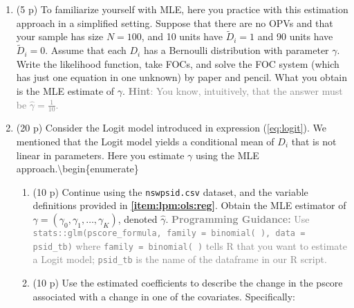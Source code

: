 \documentclass[
]{article}
\begin{document}
\begin{enumerate}
\def\labelenumi{\arabic{enumi}.}
\setcounter{enumi}{3}
\item
  (5 p) To familiarize yourself with MLE, here you practice with this
  estimation approach in a simplified setting. Suppose that there are no
  OPVs and that your sample has size \(N=100\), and 10 units have
  \(\tilde{D}_i=1\) and 90 units have \(\tilde{D}_i=0\). Assume that
  each \(D_i\) has a Bernoulli distribution with parameter \(\gamma\).
  Write the likelihood function, take FOCs, and solve the FOC system
  (which has just one equation in one unknown) by paper and pencil. What
  you obtain is the MLE estimate of \(\gamma\).
  \textcolor{gray}{\textbf{Hint}: You know, intuitively, that the answer must be $\hat{\gamma}=\frac{1}{10}$.}
\item
  (20 p) Consider the Logit model introduced in expression
  (\ref{eq:logit}). We mentioned that the Logit model yields a
  conditional mean of \(D_i\) that is not linear in parameters. Here you
  estimate \(\gamma\) using the MLE
  approach.\textbackslash begin\{enumerate\}

  \begin{enumerate}
  \def\labelenumii{\alph{enumii}.}
  \item
    (10 p) Continue using the \texttt{nswpsid.csv} dataset, and the
    variable definitions provided in \textbf{\ref{item:lpm:ols:reg}}.
    Obtain the MLE estimator of
    \(\gamma= (\gamma_0,\gamma_1,\dots,\gamma_K)\), denoted
    \(\hat{\gamma}\).
    \textcolor{gray}{\textbf{Programming Guidance:} Use \\ \texttt{stats::glm(pscore\_formula, family = binomial( ), data = psid\_tb)} where \texttt{family = binomial( )} tells R that you want to estimate a Logit model; \texttt{psid\_tb} is the name of the dataframe in our R script.}\label{item:logit:reg}
  \item
    (10 p) Use the estimated coefficients to describe the change in the
    pscore associated with a change in one of the covariates.
    Specifically:


\end{enumerate}
\end{enumerate}
\end{document}
